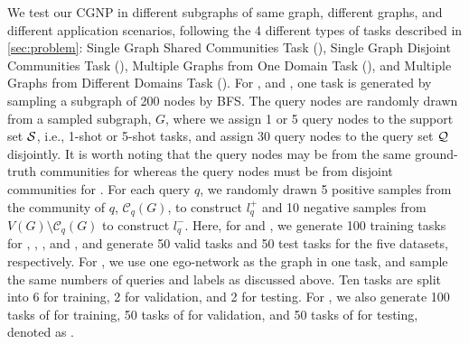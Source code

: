  We test our CGNP in different subgraphs of
same graph, different graphs, and different application scenarios,
%
following the 4 different types of tasks described in \cref{sec:problem}:
%
 Single Graph Shared Communities Task (\SGSC), 
 Single Graph Disjoint Communities Task (\SGDC), 
 Multiple Graphs from One Domain Task (\MGOD), and   
 Multiple Graphs from Different Domains Task (\MGDD).
%
For \SGSC, \SGDC and \MGDD, one task is generated by sampling a
subgraph of 200 nodes by BFS.
The query nodes are randomly drawn from a sampled subgraph,
$G$, where we assign 1 or 5 query nodes to the support set $\mathcal{S}$,
i.e., 1-shot or 5-shot tasks, and assign 30 query nodes to the query
set $\mathcal{Q}$ disjointly.  It is worth noting that
%
%
the query nodes
%
%
may be from the same ground-truth communities for \SGSC whereas the
query nodes must be from disjoint communities for \SGDC.
%
For each query $q$, we randomly drawn 5 positive samples from the
community of $q$, $\mathcal{C}_{q}(G)$, to construct $l_q^{+}$ and 10
negative samples from $V(G) \setminus \mathcal{C}_{q}(G)$ to construct
$l_q^{-}$.
%
Here, for \SGSC and \SGDC, we
generate 100 training tasks for \Cora, \Citeseer, \Arxiv, \Reddit and
\DBLP, and generate 50 valid tasks and 50 test tasks for the five
datasets, respectively.
%
For \MGOD, we use one \Facebook ego-network as the graph in one task,
and sample the same numbers of queries and labels as discussed
above. Ten tasks are split into 6 for training, 2 for validation, and
2 for testing.
%
For \MGDD, we also generate 100 tasks of \Citeseer for training, 50
tasks of \Cora for validation, and 50 tasks of \Cora for testing,
denoted as \Citeseercora.


